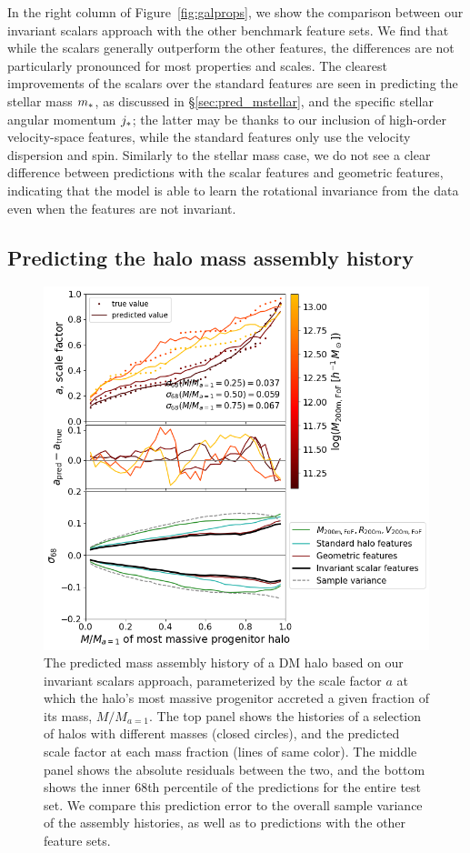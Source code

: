 In the right column of Figure~\ref{fig:galprops}, we show the comparison between our invariant scalars approach with the other benchmark feature sets.
We find that while the scalars generally outperform the other features, the differences are not particularly pronounced for most properties and scales.
The clearest improvements of the scalars over the standard features are seen in predicting the stellar mass $m_*$, as discussed in \S\ref{sec:pred_mstellar}, and the specific stellar angular momentum $j_*$; the latter may be thanks to our inclusion of high-order velocity-space features, while the standard features only use the velocity dispersion and spin.
Similarly to the stellar mass case, we do not see a clear difference between predictions with the scalar features and geometric features, indicating that the model is able to learn the rotational invariance from the data even when the features are not invariant.


\subsection{Predicting the halo mass assembly history}


\begin{figure}
    \includegraphics[width=0.77\columnwidth,right]{pred_amfracs.png}
    \caption{The predicted mass assembly history of a DM halo based on our invariant scalars approach, parameterized by the scale factor $a$ at which the halo's most massive progenitor accreted a given fraction of its mass, $M/M_{a=1}$. The top panel shows the histories of a selection of halos with different masses (closed circles), and the predicted scale factor at each mass fraction (lines of same color). The middle panel shows the absolute residuals between the two, and the bottom shows the inner 68th percentile of the predictions for the entire test set. We compare this prediction error to the overall sample variance of the assembly histories, as well as to predictions with the other feature sets.}
    \label{fig:mah}
\end{figure}



